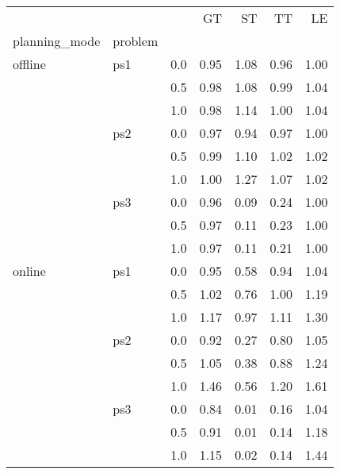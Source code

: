 \begin{tabular}{lllrrrr}
\toprule
       &     &     &   GT &   ST &   TT &   LE \\
planning\_mode & problem & {} &      &      &      &      \\
\midrule
offline & ps1 & 0.0 & 0.95 & 1.08 & 0.96 & 1.00 \\
       &     & 0.5 & 0.98 & 1.08 & 0.99 & 1.04 \\
       &     & 1.0 & 0.98 & 1.14 & 1.00 & 1.04 \\
       & ps2 & 0.0 & 0.97 & 0.94 & 0.97 & 1.00 \\
       &     & 0.5 & 0.99 & 1.10 & 1.02 & 1.02 \\
       &     & 1.0 & 1.00 & 1.27 & 1.07 & 1.02 \\
       & ps3 & 0.0 & 0.96 & 0.09 & 0.24 & 1.00 \\
       &     & 0.5 & 0.97 & 0.11 & 0.23 & 1.00 \\
       &     & 1.0 & 0.97 & 0.11 & 0.21 & 1.00 \\
online & ps1 & 0.0 & 0.95 & 0.58 & 0.94 & 1.04 \\
       &     & 0.5 & 1.02 & 0.76 & 1.00 & 1.19 \\
       &     & 1.0 & 1.17 & 0.97 & 1.11 & 1.30 \\
       & ps2 & 0.0 & 0.92 & 0.27 & 0.80 & 1.05 \\
       &     & 0.5 & 1.05 & 0.38 & 0.88 & 1.24 \\
       &     & 1.0 & 1.46 & 0.56 & 1.20 & 1.61 \\
       & ps3 & 0.0 & 0.84 & 0.01 & 0.16 & 1.04 \\
       &     & 0.5 & 0.91 & 0.01 & 0.14 & 1.18 \\
       &     & 1.0 & 1.15 & 0.02 & 0.14 & 1.44 \\
\bottomrule
\end{tabular}
